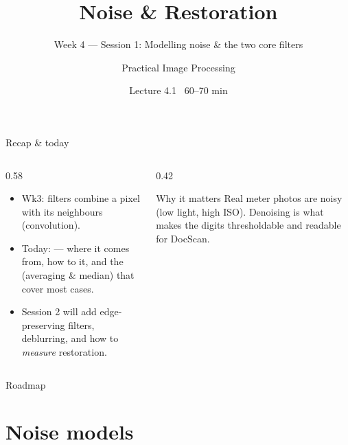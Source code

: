 \documentclass[10pt,aspectratio=169]{beamer}
\title{Noise \& Restoration}
\subtitle{Week 4 — Session 1: Modelling noise \& the two core filters}
\author{Practical Image Processing}
\date{Lecture 4.1 \textbullet\ 60--70 min}
\begin{document}
\maketitle

\begin{frame}{Recap \& today}
  \begin{columns}[T]
    \begin{column}{0.58\textwidth}
      \begin{itemize}
        \item Wk3: filters combine a pixel with its neighbours (convolution).
        \item \alert{Today:}  — where it comes from, how to  it,
              and the  (averaging \& median) that cover most cases.
        \item Session 2 will add edge-preserving filters, deblurring, and how to \emph{measure} restoration.
      \end{itemize}
    \end{column}
    \begin{column}{0.42\textwidth}
      \begin{alertblock}{Why it matters}
        Real meter photos are noisy (low light, high ISO). Denoising is what makes the digits
        thresholdable and readable for DocScan.
      \end{alertblock}
    \end{column}
  \end{columns}
\end{frame}

\begin{frame}{Roadmap}\tableofcontents\end{frame}

\section{Noise models}
\end{document}
